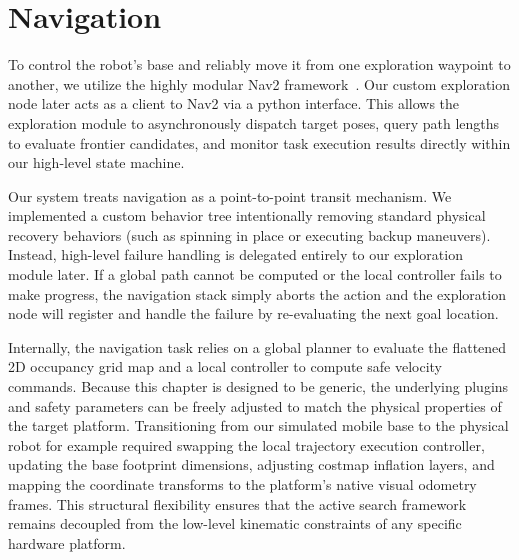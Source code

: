 \documentclass[
	parspace, %
	noindent, %
	final, %
]{elteikthesis}
\begin{document}
\section{Navigation}
To control the robot's base and reliably move it from one exploration waypoint to another, we utilize the highly modular Nav2 framework~\cite{macenski2020marathon2}. Our custom exploration node later acts as a client to Nav2 via a python interface. This allows the exploration module to asynchronously dispatch target poses, query path lengths to evaluate frontier candidates, and monitor task execution results directly within our high-level state machine.


Our system treats navigation as a point-to-point transit mechanism. We implemented a custom behavior tree intentionally removing standard physical recovery behaviors (such as spinning in place or executing backup maneuvers). Instead, high-level failure handling is delegated entirely to our exploration module later. If a global path cannot be computed or the local controller fails to make progress, the navigation stack simply aborts the action and the exploration node will register and handle the failure by re-evaluating the next goal location.

Internally, the navigation task relies on a global planner to evaluate the flattened 2D occupancy grid map and a local controller to compute safe velocity commands. Because this chapter is designed to be generic, the underlying plugins and safety parameters can be freely adjusted to match the physical properties of the target platform. Transitioning from our simulated mobile base to the physical robot for example required swapping the local trajectory execution controller, updating the base footprint dimensions, adjusting costmap inflation layers, and mapping the coordinate transforms to the platform's native visual odometry frames. This structural flexibility ensures that the active search framework remains decoupled from the low-level kinematic constraints of any specific hardware platform.
\end{document}
